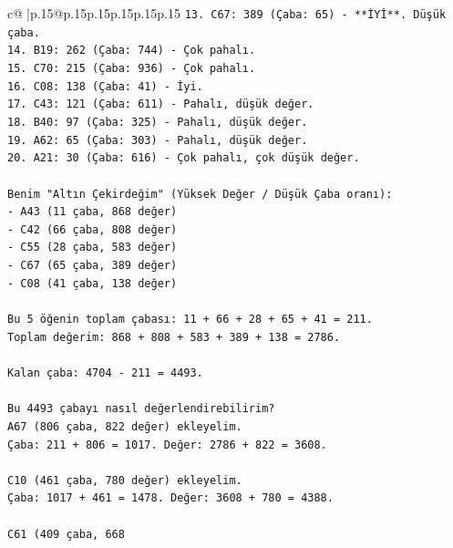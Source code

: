 \documentclass{article}
\begin{document}
{\begin{supertabular}{c@{$\;$}|p{.15\linewidth}@{}p{.15\linewidth}p{.15\linewidth}p{.15\linewidth}p{.15\linewidth}p{.15\linewidth}}
{{{\texttt{13. C67: 389 (Çaba: 65) {-} **İYİ**. Düşük çaba.} \\
\texttt{14. B19: 262 (Çaba: 744) {-} Çok pahalı.} \\
\texttt{15. C70: 215 (Çaba: 936) {-} Çok pahalı.} \\
\texttt{16. C08: 138 (Çaba: 41) {-} İyi.} \\
\texttt{17. C43: 121 (Çaba: 611) {-} Pahalı, düşük değer.} \\
\texttt{18. B40: 97 (Çaba: 325) {-} Pahalı, düşük değer.} \\
\texttt{19. A62: 65 (Çaba: 303) {-} Pahalı, düşük değer.} \\
\texttt{20. A21: 30 (Çaba: 616) {-} Çok pahalı, çok düşük değer.} \\
\\ 
\texttt{Benim "Altın Çekirdeğim" (Yüksek Değer / Düşük Çaba oranı):} \\
\texttt{{-} A43 (11 çaba, 868 değer)} \\
\texttt{{-} C42 (66 çaba, 808 değer)} \\
\texttt{{-} C55 (28 çaba, 583 değer)} \\
\texttt{{-} C67 (65 çaba, 389 değer)} \\
\texttt{{-} C08 (41 çaba, 138 değer)} \\
\\ 
\texttt{Bu 5 öğenin toplam çabası: 11 + 66 + 28 + 65 + 41 = 211.} \\
\texttt{Toplam değerim: 868 + 808 + 583 + 389 + 138 = 2786.} \\
\\ 
\texttt{Kalan çaba: 4704 {-} 211 = 4493.} \\
\\ 
\texttt{Bu 4493 çabayı nasıl değerlendirebilirim?} \\
\texttt{A67 (806 çaba, 822 değer) ekleyelim.} \\
\texttt{Çaba: 211 + 806 = 1017. Değer: 2786 + 822 = 3608.} \\
\\ 
\texttt{C10 (461 çaba, 780 değer) ekleyelim.} \\
\texttt{Çaba: 1017 + 461 = 1478. Değer: 3608 + 780 = 4388.} \\
\\ 
\texttt{C61 (409 çaba, 668} \\
            }
        }
    }
     \\ \\


\end{supertabular}}
\end{document}
